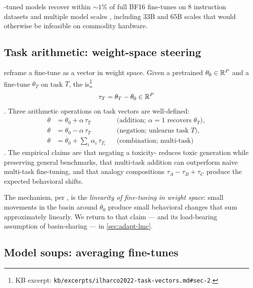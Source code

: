 -tuned models recover within $\sim\!1\%$ of full BF16 fine-tunes
on 8 instruction datasets and multiple model scales
\citep[\S 4]{dettmers2023-qlora}, including 33B and 65B scales that
would otherwise be infeasible on commodity hardware.

\subsection{Task arithmetic: weight-space steering}
\label{sec:adapt-taskvec}

\citet{ilharco2022-task-vectors} reframe a fine-tune as a vector in
weight space. Given a pretrained $\theta_0 \in \mathbb{R}^P$ and a fine-tune
$\theta_T$ on task $T$, the \emph{} is\footnote{KB excerpt:
\texttt{kb/excerpts/ilharco2022-task-vectors.md\#sec-2}.}
\begin{equation}
\tau_T = \theta_T - \theta_0 \in \mathbb{R}^P
\label{eq:task-vector}
\end{equation}
\citep[\S 2]{ilharco2022-task-vectors}. Three arithmetic operations on
task vectors are well-defined:
\begin{align}
\theta &= \theta_0 + \alpha\, \tau_T && \text{(addition; $\alpha = 1$ recovers $\theta_T$)}, \label{eq:tv-add}\\
\theta &= \theta_0 - \alpha\, \tau_T && \text{(negation; unlearns task $T$)}, \label{eq:tv-neg}\\
\theta &= \theta_0 + \sum_i \alpha_i\, \tau_{T_i} && \text{(combination; multi-task)} \label{eq:tv-combine}
\end{align}
\citep[\S 2]{ilharco2022-task-vectors}. The empirical claims
\citep[\S 3]{ilharco2022-task-vectors} are that negating a
toxicity- reduces toxic generation while preserving general
benchmarks, that multi-task addition can outperform naive multi-task
fine-tuning, and that analogy compositions $\tau_A - \tau_B + \tau_C$
produce the expected behavioral shifts.

The mechanism, per \citet[\S 4]{ilharco2022-task-vectors}, is the
\emph{linearity of fine-tuning in weight space}: small movements in
the basin around $\theta_0$ produce small behavioral changes that sum
approximately linearly. We return to that claim — and its load-bearing
assumption of basin-sharing — in \cref{sec:adapt-lmc}.

\subsection{Model soups: averaging fine-tunes}
\label{sec:adapt-soups}

